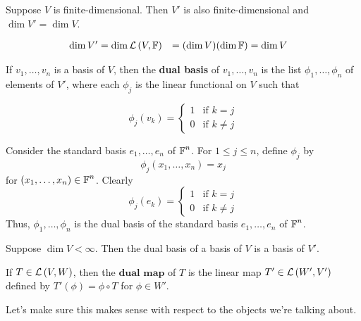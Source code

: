 \begin{theorem} [$\dim V' = \dim V$]
   Suppose $V$ is finite-dimensional. Then $V'$ is also finite-dimensional
   and $\dim V' = \dim V$.

   \begin{proof*}
      \begin{align*}
         \dim V' &= \dim \mathcal{L} \left( V, \operatorname{\mathbb{F}} \right)
         &= (\dim V)(\dim \operatorname{\mathbb{F}})
         &= \dim V
      \end{align*}
   \end{proof*}
\end{theorem}

\begin{definition}
   If $v_1, \dots, v_n$ is a basis of $V$, then the \textbf{dual basis}
   of $v_1, \dots, v_n$ is the list $\phi_1, \dots, \phi_n$ of elements
   of $V'$, where each $\phi_j$ is the linear functional on $V$ such that

   \[ \phi_j(v_k) = 
   \begin{cases}
      1 & \text{if } k = j \\
      0 & \text{if } k \neq j 
   \end{cases}
   \]
\end{definition}

\begin{example}
   Consider the standard basis $e_1, \dots, e_n$ of $\operatorname{\mathbb{F}}^n$.
   For $1 \leq j \leq n$, define $\phi_j$ by
   \[ \phi_j(x_1, \dots, x_n) = x_j \]
   for $(x_1, \dots, x_n) \in \operatorname{\mathbb{F}}^n$. Clearly
   \[ \phi_j(e_k) = \begin{cases}
      1 & \text{if } k = j \\
      0 & \text{if } k \neq j 
   \end{cases} \]
   Thus, $\phi_1, \dots, \phi_n$ is the dual basis of the
   standard basis $e_1, \dots, e_n$ of $\operatorname{\mathbb{F}}^n$.
\end{example}

\begin{theorem}
   Suppose $\dim V < \infty$. Then the dual basis
   of a basis of $V$ is a basis of $V'$.
\end{theorem}

\begin{definition} 
   If $T \in \mathcal{L} \left( V, W \right)$, then the $\textbf{dual map}$ of $T$ is
   the linear map $T' \in \mathcal{L} \left( W', V' \right)$ defined by $T'(\phi) = \phi \circ T$
   for $\phi \in W'$.
\end{definition}

Let's make sure this makes sense with respect to the objects we're talking about.


